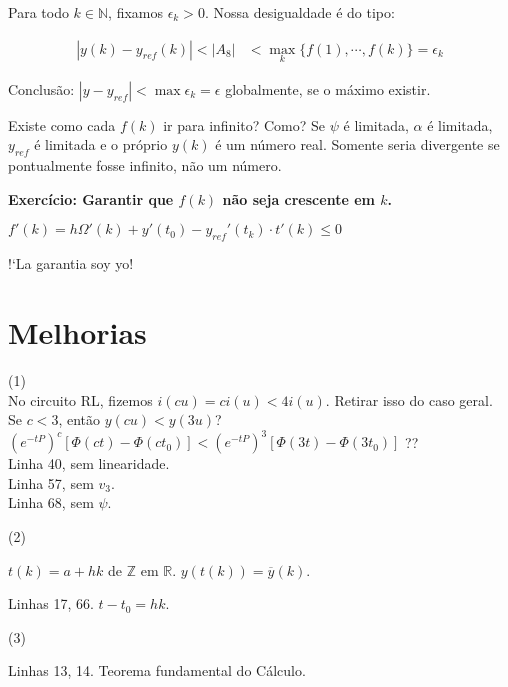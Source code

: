 \documentclass[12pt]{article}
\begin{document}
Para todo $k \in \mathbb{N}$, fixamos $\epsilon_k >0$. Nossa desigualdade \'e do tipo:

\begin{align}
| y(k) - y_{ref}(k) | < | A_8 | &< \max_k \{ f(1), \cdots, f(k) \} = \epsilon_k
\end{align}

Conclus\~ao: $| y - y_{ref} | < \max \epsilon_k = \epsilon$ globalmente, se o m\'aximo existir.

Existe como cada $f(k)$ ir para infinito? Como? Se $\psi$ \'e limitada, $\alpha$ \'e limitada, $y_{ref}$ \'e limitada e o pr\'oprio $y(k)$ \'e um n\'umero real. Somente seria divergente se pontualmente fosse infinito, n\~ao um n\'umero.

\textbf{Exerc\'icio: Garantir que $f(k)$ n\~ao seja crescente em $k$.}

$f'(k) = h \Omega'(k) + y'(t_0) -  y_{ref}'(t_k) \cdot t'(k) \le 0$

\vspace{3mm}

!`La garantia soy yo!

\section{Melhorias}

\begin{flushleft}
(1) \\
No circuito RL, fizemos $i(cu) = ci(u) < 4 i(u)$. Retirar isso do caso geral. \\
Se $c < 3$, ent\~ao $y(cu) < y(3u)$? \\
$(e^{-tP})^c [\Phi(ct) - \Phi(ct_0)] < (e^{-tP})^3 [\Phi(3t) - \Phi(3t_0)]$ ?? \\
Linha 40, sem linearidade. \\
Linha 57, sem $v_3$. \\
Linha 68, sem $\psi$.
\end{flushleft}

(2)

$t(k) = a + hk$ de $\mathbb{Z}$ em $\mathbb{R}$. $y(t(k)) = \overline{y}(k)$.

Linhas 17, 66. $t - t_0 = hk$.

\vspace{3mm}

(3)

Linhas 13, 14. Teorema fundamental do C\'alculo.

\vspace{3mm}
\end{document}
